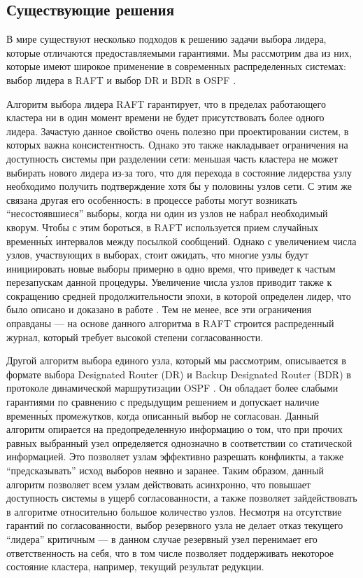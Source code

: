 \subsection{Существующие решения}

В мире существуют несколько подходов к решению задачи выбора лидера, которые отличаются предоставляемыми гарантиями. Мы рассмотрим два из них, которые имеют широкое применение в современных распределенных системах: выбор лидера в RAFT \cite{RAFT} и выбор DR и BDR в OSPF  \cite[с.~75]{RFC2328}.

Алгоритм выбора лидера RAFT гарантирует, что в пределах работающего кластера ни в один момент времени не будет присутствовать более одного лидера. Зачастую данное свойство очень полезно при проектировании систем, в которых важна консистентность. Однако это также накладывает ограничения на доступность системы при разделении сети: меньшая часть кластера не может выбирать нового лидера из-за того, что для перехода в состояние лидерства узлу необходимо получить подтверждение хотя бы у половины узлов сети. С этим же связана другая его особенность: в процессе работы могут возникать \enquote{несостоявшиеся} выборы, когда ни один из узлов не набрал необходимый кворум. Чтобы с этим бороться, в RAFT используется прием случайных временн\'{ы}х интервалов между посылкой сообщений. Однако с увеличением числа узлов, участвующих в выборах, стоит ожидать, что многие узлы будут инициировать новые выборы примерно в одно время, что приведет к частым перезапускам данной процедуры. Увеличение числа узлов приводит также к сокращению средней продолжительности эпохи, в которой определен лидер, что было описано и доказано в работе \cite{RAFT_performance_1808.01081}. Тем не менее, все эти ограничения оправданы --- на основе данного алгоритма в RAFT строится распреденный журнал, который требует высокой степени согласованности.

Другой алгоритм выбора единого узла, который мы рассмотрим, описывается в формате выбора Designated Router (DR) и Backup Designated Router (BDR) в протоколе динамической маршрутизации OSPF \cite[с.~75]{RFC2328}. Он обладает более слабыми гарантиями по сравнению с предыдущим решением и допускает наличие временн\'{ы}х промежутков, когда описанный выбор не согласован. Данный алгоритм опирается на предопределенную информацию о том, что при прочих равных выбранный узел определяется однозначно в соответствии со статической информацией. Это позволяет узлам эффективно разрешать конфликты, а также \enquote{предсказывать} исход выборов неявно и заранее. Таким образом, данный алгоритм позволяет всем узлам действовать асинхронно, что повышает доступность системы в ущерб согласованности, а также позволяет зайдействовать в алгоритме относительно большое количество узлов. Несмотря на отсутствие гарантий по согласованности, выбор резервного узла не делает отказ текущего \enquote{лидера} критичным --- в данном случае резервный узел перенимает его ответственность на себя, что в том числе позволяет поддерживать некоторое состояние кластера, например, текущий результат редукции.

